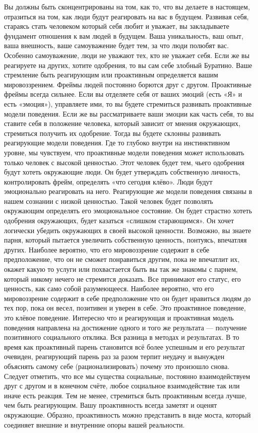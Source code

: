 Вы должны быть сконцентрированы на том, как то, что вы делаете в настоящем, отразиться на том, как люди будут реагировать на вас в будущем. Развивая себя, стараясь стать человеком который себя любит и уважает, вы закладываете фундамент отношения к вам людей в будущем. Ваша уникальность, ваш опыт, ваша внешность, ваше самоуважение будет тем, за что люди полюбят вас. Особенно самоуважение, люди не уважают тех, кто не уважает себя. Если же вы реагируете на других, хотите одобрения, то вы сам себе злобный Буратино. Ваше стремление быть реагирующим или проактивным определяется вашим мировоззрением. Фреймы людей постоянно борются друг с другом. Проактивные фреймы всегда сильнее. Если вы отделяете себя от ваших эмоций (есть «Я» и есть «эмоция»), управляете ими, то вы будете стремиться развивать проактивные модели поведения. Если же вы рассматриваете ваши эмоции как часть себя, то вы ставите себя в положение человека, который зависит от мнения окружающих, стремиться получить их одобрение. Тогда вы будете склонны развивать реагирующие модели поведения. Где то глубоко внутри на инстинктивном уровне, мы чувствуем, что проактивные модели поведения может использовать только человек с высокой ценностью. Этот человек будет тем, чьего одобрения будут хотеть окружающие люди. Он будет утверждать собственную личность, контролировать фрейм, определять «что сегодня клёво». Люди будут эмоционально реагировать на него. Реагирующие же модели поведения связаны в нашем сознании с низкой ценностью. Такой человек будет позволять окружающим определять его эмоциональное состояние. Он будет страстно хотеть одобрения окружающих, будет казаться «слишком старающимся». Он хочет логически убедить окружающих в своей высокой ценности. Возможно, вы знаете парня, который пытается увеличить собственную ценность, понтуясь, впечатляя других. Наиболее вероятно, что его мировоззрение содержит в себе предположение, что он не сможет понравиться другим, пока не впечатлит их, окажет какую то услуги или похвастается быть вы так же знакомы с парнем, который никому нечего не стремится доказать. Все принимают его статус, его ценность, как само собой разумеющееся. Наиболее вероятно, что его мировоззрение содержит в себе предположение что он будет нравиться людям до тех пор, пока он весел, позитивен и уверен в себе. Это проактивное поведение, это клёвое поведение. Интересно что и реагирующая и проактивная модель поведения направлена на достижение одного и того же результата --- получение позитивного социального отклика. Вся разница в методах и результатах. В то время как проактивный парень становится всё более успешным и его результат очевиден, реагирующий парень раз за разом терпит неудачу и вынужден объяснять самому себе (рационализировать) почему это произошло снова. Следует отметить, что все мы существа социальные, постоянно взаимодействуем друг с другом и в конечном счёте, любое социальное взаимодействие так или иначе есть реакция. Тем не менее, стремиться быть проактивным всегда лучше, чем быть реагирующим. Вашу проактивность всегда заметят и оценят окружающие. Образно, проактивность можно представить в виде моста, который соединяет внешние и внутренние опоры вашей реальности.
